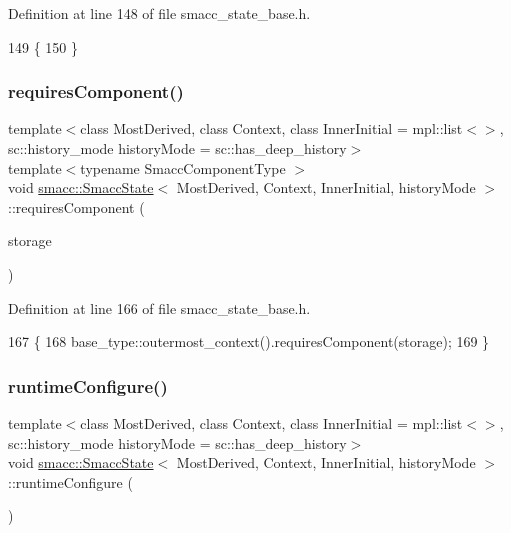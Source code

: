 Definition at line 148 of file smacc\+\_\+state\+\_\+base.\+h.


\begin{DoxyCode}
149   \{
150   \}
\end{DoxyCode}
\mbox{\label{classsmacc_1_1SmaccState_a2febb778d5c3d80b9c034576b5a92b65}} 
\subsubsection{\texorpdfstring{requires\+Component()}{requiresComponent()}}
{\footnotesize\ttfamily template$<$class Most\+Derived, class Context, class Inner\+Initial = mpl\+::list$<$$>$, sc\+::history\+\_\+mode history\+Mode = sc\+::has\+\_\+deep\+\_\+history$>$ \\
template$<$typename Smacc\+Component\+Type $>$ \\
void \hyperlink{classsmacc_1_1SmaccState}{smacc\+::\+Smacc\+State}$<$ Most\+Derived, Context, Inner\+Initial, history\+Mode $>$\+::requires\+Component (\begin{DoxyParamCaption}\item[{Smacc\+Component\+Type $\ast$\&}]{storage }\end{DoxyParamCaption})\hspace{0.3cm}{\ttfamily [inline]}}



Definition at line 166 of file smacc\+\_\+state\+\_\+base.\+h.


\begin{DoxyCode}
167   \{
168     base\_type::outermost\_context().requiresComponent(storage);
169   \}
\end{DoxyCode}
\mbox{\label{classsmacc_1_1SmaccState_a6995704a0232e24f4c38250302c0a01f}} 
\subsubsection{\texorpdfstring{runtime\+Configure()}{runtimeConfigure()}}
{\footnotesize\ttfamily template$<$class Most\+Derived, class Context, class Inner\+Initial = mpl\+::list$<$$>$, sc\+::history\+\_\+mode history\+Mode = sc\+::has\+\_\+deep\+\_\+history$>$ \\
void \hyperlink{classsmacc_1_1SmaccState}{smacc\+::\+Smacc\+State}$<$ Most\+Derived, Context, Inner\+Initial, history\+Mode $>$\+::runtime\+Configure (\begin{DoxyParamCaption}{ }\end{DoxyParamCaption})\hspace{0.3cm}{\ttfamily [inline]}}



